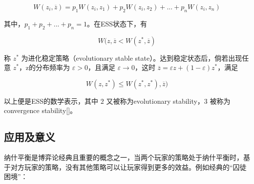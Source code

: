 \documentclass[12pt]{article}
\begin{document}
\begin{displaymath}
W(z_i,\overline{z})=p_1W(z_i,z_1)+p_2W(z_i,z_2)+...+p_nW(z_i,z_n)
\end{displaymath}

其中，$p_1+p_2+...+p_n=1$。在ESS状态下，有
 
\begin{displaymath}
W(z,\overline{z}<W(z^{*},\overline{z})
\end{displaymath}

称 $z^*$ 为进化稳定策略（evolutionary stable state）。达到稳定状态后，倘若出现任意 ${z^*}$，z的分布频率为 $\varepsilon>0$，且满足 $\varepsilon\to{0}$，这时 $\overline z=\varepsilon{z}+(1-\varepsilon)z^*$，满足

\begin{displaymath}
W(z,z^*)\leq{W(z^*,z^*)},\overline{z})
\end{displaymath}

以上便是ESS的数学表示，其中 $2$ 又被称为evolutionary stability，$3$ 被称为convergence stability[\cite{christiansen1991conditions}]。



\subsection{应用及意义}
纳什平衡是博弈论经典且重要的概念之一，当两个玩家的策略处于纳什平衡时，基于对方玩家的策略，没有其他策略可以让玩家得到更多的效益。例如经典的“囚徒困境”：
\end{document}
